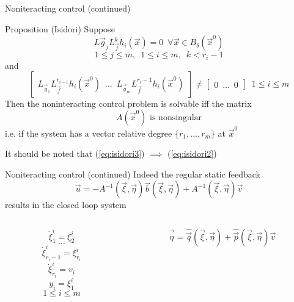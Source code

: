 \begin{frame}[shrink = 10]{Noniteracting control (continued) \theory}
  \begin{block}{Proposition (Isidori)}
    Suppose
    \begin{equation}\label{eq:isidori1}
      L{\vec{g}_j}L_{\vec{f}}^{k}h_{i}(\vec{x}) = 0 \enspace \forall \vec{x} \in B_{\delta}(\vec{x}^0)
    \end{equation}
    \[
    1 \le j \le m, \enspace 1 \le i \le m, \enspace k < r_i-1
    \]
    and
    \begin{equation}\label{eq:isidori2}
      \begin{bmatrix}
        L_{\vec{g}_1}L_{\vec{f}}^{r_{i-1}}h_i(\vec{x}^{0}) \enspace \hdots \enspace L_{\vec{g}_m}L_{\vec{f}}^{r_i-1}h_i(\vec{x}^{0})
      \end{bmatrix}
    \ne
    \begin{bmatrix}
      0 \enspace \hdots \enspace 0
    \end{bmatrix}
    \enspace 1 \le i \le m
    \end{equation}
    Then the noninteracting control problem is solvable iff the matrix 
    \begin{equation}\label{eq:isidori3}
      A(\vec{x}^{0}) \text{ is nonsingular}
    \end{equation}
    i.e. if the system has a vector relative degree $\{r_1, \hdots, r_m\}$ at $\vec{x}^{0}$
  \end{block}
  \alert{It should be noted that (\ref{eq:isidori3}) $\implies$ (\ref{eq:isidori2})}
\end{frame}

\begin{frame}{Noniteracting control (continued) \theory}
  Indeed the regular static feedback
  \[
  \vec{u} = -A^{-1}(\vec{\xi},\vec{\eta})\vec{b}(\vec{\xi},\vec{\eta}) + A^{-1}(\vec{\xi},\vec{\eta})\vec{v}
  \]
  results in the closed loop system
  \begin{columns}[t]
    \begin{column}{0.5\textwidth}
      \[
      \dot{\xi}_{1}^{i} = \xi_{2}^{i}
      \]
      \[
      \hdots
      \]
      \[
      \dot{\xi}_{r_{i}-1}^{i} = \xi_{r_{i}}^{i}
      \]
      \[
      \dot{\xi}_{r_{i}}^{i} = v_{i}
      \]
      \[
      y_{i} = \xi_{1}^{i}
      \]
      \[
      1 \le i \le m
      \]
    \end{column}
    \begin{column}{0.5\textwidth}
      \[
      \vec{\dot{\eta}}  = \hat{\vec{q}}(\vec{\xi},\vec{\eta}) + \hat{\vec{p}}(\vec{\xi},\vec{\eta})\vec{v}
      \]
    \end{column}
  \end{columns}
\end{frame}

